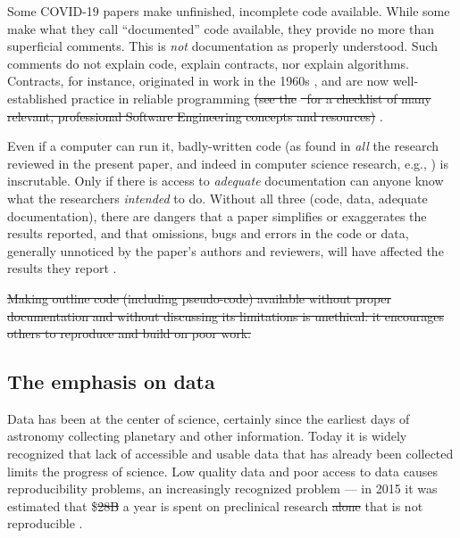 \documentclass{comjnl}
\providecommand{\DIFadd}[1]{{\protect\color{blue}\uwave{#1}}} %
\providecommand{\DIFdel}[1]{{\protect\color{red}\sout{#1}}}                      %
\providecommand{\DIFaddbegin}{} %
\providecommand{\DIFaddend}{} %
\providecommand{\DIFdelbegin}{} %
\providecommand{\DIFdelend}{} %
\begin{document}
Some COVID-19 papers  make unfinished, incomplete code available. While some  make what they call ``documented'' code available, they provide no more than superficial comments. This is \emph{not\/} documentation as properly understood. Such comments do not explain code, explain contracts, nor explain algorithms. Contracts, for instance, originated in work in the 1960s \cite{hoare}, and are now well-established practice in reliable programming\DIFdelbegin %
\DIFdel{(see the }%
\DIFdel{\ for a checklist of many relevant, professional Software Engineering concepts and resources)}%
\DIFdelend .

Even if a computer can run it, badly-written code (as found in \emph{all\/} the research reviewed in the present paper, and indeed in computer science research, e.g., \cite{machine-learning-reproducibility}) is inscrutable. Only if there is access to \emph{adequate\/} documentation can anyone know what the researchers \emph{intended\/} to do. Without all three (code, data, adequate documentation), there are dangers that a paper simplifies or exaggerates the results reported, and that omissions, bugs and errors in the code or data, generally unnoticed by the paper's authors and reviewers, will have affected the results they report \cite{relit}. 

\DIFdelbegin \DIFdel{Making outline code (including pseudo-code) available without proper documentation and without discussing its limitations is unethical: it encourages others to reproduce and build on poor work. 
}%

\DIFdelend \label{section-discussion}
\subsection{The \DIFaddbegin \DIFadd{narrow }\DIFaddend emphasis on data}
\DIFaddbegin \label{critique-fair}
\DIFaddend Data has been at the center of science, certainly since the earliest days of astronomy collecting planetary and other information. Today it is widely recognized that lack of accessible and usable data that has already been collected limits the progress of science. Low quality data and poor access to data causes reproducibility problems, an increasingly recognized problem --- in 2015 it was estimated that \$\DIFdelbegin \DIFdel{28B }\DIFdelend \DIFaddbegin \DIFadd{28 billion }\DIFaddend a year is spent on preclinical research \DIFdelbegin \DIFdel{alone }\DIFdelend that is not reproducible \cite{preclinical-reproducibility}.
\end{document}
